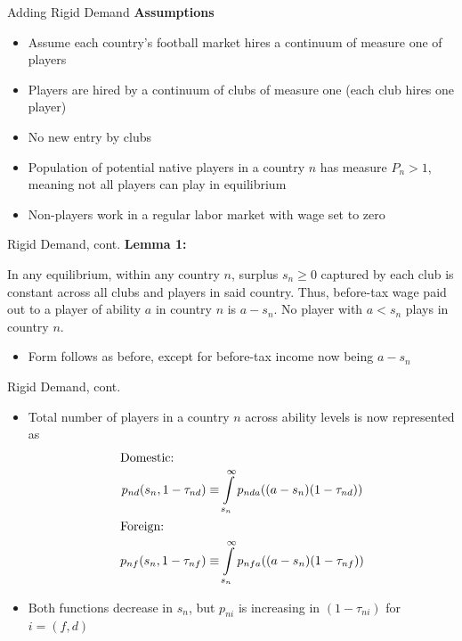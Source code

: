 \documentclass[aspectratio=169,professionalfonts]{beamer}
\newcommand{\hl}[1]{\textbf{\textcolor{UGARed}{#1}}}
\newcommand{\hl}[1]{\textbf{\color{UGARed}{#1}}}
\begin{document}
\begin{frame}{Adding Rigid Demand}
  \hl{Assumptions}
  \begin{itemize}
    \item Assume each country's football market hires a continuum of measure one of players
    \item Players are hired by a continuum of clubs of measure one (each club hires one player)
    \item No new entry by clubs
    \item Population of potential native players in a country $n$ has measure $P_n > 1$, meaning not all players can play in equilibrium
    \item Non-players work in a regular labor market with wage set to zero
  \end{itemize}
\end{frame}
\begin{frame}{Rigid Demand, cont.}
  \hl{Lemma 1:}
  \begin{tcolorbox}[colback=red!5!white,colframe=red!75!black]
    In any equilibrium, within any country $n$, surplus $s_n\geq0$ captured by each club is constant across all clubs and players in said country.
    Thus, before-tax wage paid out to a player of ability $a$ in country $n$ is $a-s_n$. No player with $a < s_n$ plays in country $n$.
  \end{tcolorbox}
  \begin{itemize}
    \item Form follows as before, except for before-tax income now being $a-s_n$
  \end{itemize}
\end{frame}
\begin{frame}{Rigid Demand, cont.}
  \begin{itemize}
    \item Total number of players in a country $n$ across ability levels is now represented as
    \begin{gather*}
      \shortintertext{Domestic:}
      p_{nd}(s_n, 1-\tau_{nd}) \equiv \int\limits_{s_n}^{\infty}p_{nda}((a-s_n)(1-\tau_{nd})) \\
      \shortintertext{Foreign:}
      p_{nf}(s_n, 1-\tau_{nf}) \equiv \int\limits_{s_n}^{\infty}p_{nfa}((a-s_n)(1-\tau_{nf})) \\
    \end{gather*}
    \item Both functions decrease in $s_n$, but $p_{ni}$ is increasing in $(1-\tau_{ni})$ for $i = (f,d)$
  \end{itemize}
\end{frame}
\end{document}

